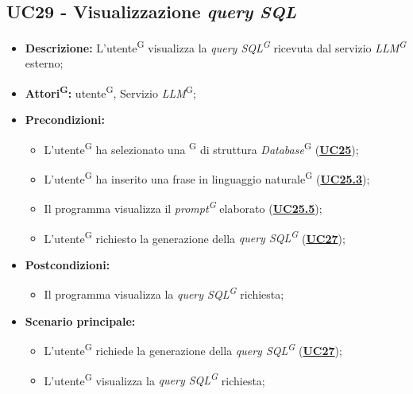 \subsection{UC29 - Visualizzazione \textit{query SQL}}
\label{sec:UC29}
\begin{itemize}
	\item \textbf{Descrizione:} L’utente\textsuperscript{G} visualizza la \textit{query SQL\textsuperscript{G}} ricevuta dal servizio \textit{LLM\textsuperscript{G}} esterno;
	\item \textbf{Attori\textsuperscript{G}:} utente\textsuperscript{G}, Servizio \textit{LLM}\textsuperscript{G};
	\item \textbf{Precondizioni:} 
	\begin{itemize}
		\item L’utente\textsuperscript{G} ha selezionato una \textsuperscript{G} di struttura \textit{Database}\textsuperscript{G} (\hyperref[sec:UC25]{\textbf{UC25}});
		\item L’utente\textsuperscript{G} ha inserito una frase in linguaggio naturale\textsuperscript{G} (\hyperref[sec:UC25.3]{\textbf{UC25.3}});
		\item Il programma visualizza il \textit{prompt\textsuperscript{G}} elaborato (\hyperref[sec:UC25.5]{\textbf{UC25.5}});
		\item L’utente\textsuperscript{G} richiesto la generazione della \textit{query SQL\textsuperscript{G}} (\hyperref[sec:UC27]{\textbf{UC27}});
	\end{itemize}
	\item \textbf{Postcondizioni:} 
	\begin{itemize}
		\item Il programma visualizza la \textit{query SQL\textsuperscript{G}} richiesta;
	\end{itemize}
	\item \textbf{Scenario principale:} 
	\begin{itemize}
		\item L'utente\textsuperscript{G} richiede la generazione della \textit{query SQL\textsuperscript{G}} (\hyperref[sec:UC27]{\textbf{UC27}});
		\item L'utente\textsuperscript{G} visualizza la \textit{query SQL\textsuperscript{G}} richiesta;
	\end{itemize}
\end{itemize}
